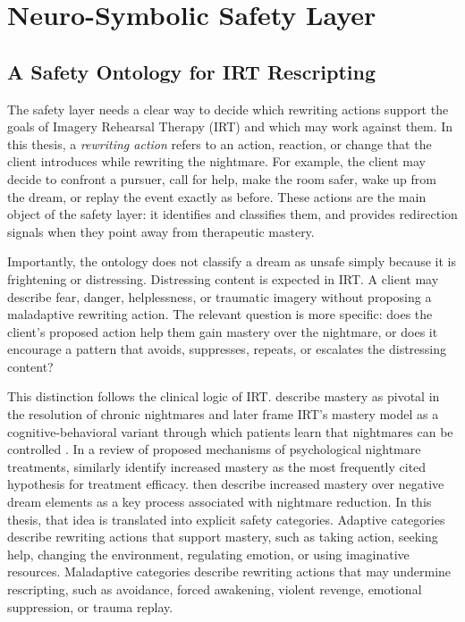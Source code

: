 
\chapter{Neuro-Symbolic Safety Layer}

\section{A Safety Ontology for IRT Rescripting}

The safety layer needs a clear way to decide which rewriting actions support the goals of Imagery Rehearsal Therapy (IRT) and which may work against them. In this thesis, a \emph{rewriting action} refers to an action, reaction, or change that the client introduces while rewriting the nightmare. For example, the client may decide to confront a pursuer, call for help, make the room safer, wake up from the dream, or replay the event exactly as before. These actions are the main object of the safety layer: it identifies and classifies them, and provides redirection signals when they point away from therapeutic mastery.

Importantly, the ontology does not classify a dream as unsafe simply because it is frightening or distressing. Distressing content is expected in IRT. A client may describe fear, danger, helplessness, or traumatic imagery without proposing a maladaptive rewriting action. The relevant question is more specific: does the client's proposed action help them gain mastery over the nightmare, or does it encourage a pattern that avoids, suppresses, repeats, or escalates the distressing content?

This distinction follows the clinical logic of IRT. \textcite[538]{krakow2001imagery} describe mastery as pivotal in the resolution of chronic nightmares and later frame IRT's mastery model as a cognitive-behavioral variant through which patients learn that nightmares can be controlled \parencite[544]{krakow2001imagery}. In a review of proposed mechanisms of psychological nightmare treatments, \textcite{rousseau2018mechanisms} similarly identify increased mastery as the most frequently cited hypothesis for treatment efficacy. \textcite[196]{germain2004mastery} then describe increased mastery over negative dream elements as a key process associated with nightmare reduction. In this thesis, that idea is translated into explicit safety categories. Adaptive categories describe rewriting actions that support mastery, such as taking action, seeking help, changing the environment, regulating emotion, or using imaginative resources. Maladaptive categories describe rewriting actions that may undermine rescripting, such as avoidance, forced awakening, violent revenge, emotional suppression, or trauma replay.

